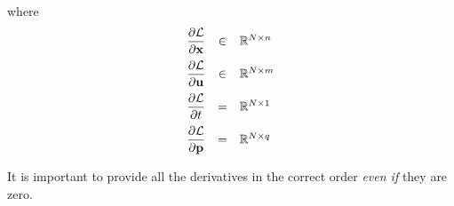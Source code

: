 \documentclass[10pt]{article}
\begin{document}
where
\begin{equation}
 \begin{array}{lcl}
\displaystyle   \pd{\mcL}{\bfx} & \in & \mathbb{R}^{N\times n}\vspace{6pt}\\
\displaystyle   \pd{\mcL}{\bfu} & \in & \mathbb{R}^{N\times m}\vspace{6pt}\\
\displaystyle   \pd{\mcL}{t} & = & \mathbb{R}^{N\times 1}\vspace{6pt}\\ 
\displaystyle  \pd{\mcL}{\bfp} & = & \mathbb{R}^{N\times q}
\end{array}
\end{equation}

It is important to provide all the derivatives in the correct order {\em even if} they are zero.
\end{document}
